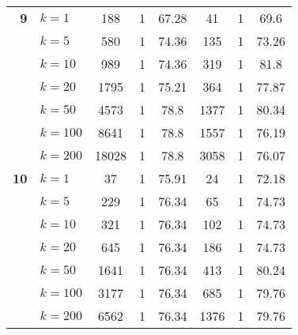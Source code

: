 \begin{table}[htbp]
\begin{tabular}{|l|l|c|c|c|c|c|c|}
    \multicolumn{1}{|r|}{\textbf{9}} & $k=1$ & 188 & 1 & 67.28 & 41 & 1 & 69.6 \\ 
     & $k=5$ & 580 & 1 & 74.36 & 135 & 1 & 73.26 \\ 
     & $k=10$ & 989 & 1 & 74.36 & 319 & 1 & 81.8 \\ 
     & $k=20$ & 1795 & 1 & 75.21 & 364 & 1 & 77.87 \\ 
     & $k=50$ & 4573 & 1 & 78.8 & 1377 & 1 & 80.34 \\ 
     & $k=100$ & 8641 & 1 & 78.8 & 1557 & 1 & 76.19 \\ 
     & $k=200$ & 18028 & 1 & 78.8 & 3058 & 1 & 76.07 \\ \hline
    \multicolumn{1}{|r|}{\textbf{10}} & $k=1$ & 37 & 1 & 75.91 & 24 & 1 & 72.18 \\ 
     & $k=5$ & 229 & 1 & 76.34 & 65 & 1 & 74.73 \\ 
     & $k=10$ & 321 & 1 & 76.34 & 102 & 1 & 74.73 \\ 
     & $k=20$ & 645 & 1 & 76.34 & 186 & 1 & 74.73 \\ 
     & $k=50$ & 1641 & 1 & 76.34 & 413 & 1 & 80.24 \\ 
     & $k=100$ & 3177 & 1 & 76.34 & 685 & 1 & 79.76 \\ 
     & $k=200$ & 6562 & 1 & 76.34 & 1376 & 1 & 79.76 \\ \hline
    \end{tabular}
\end{table}

